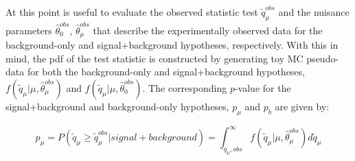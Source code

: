 At this point is useful to evaluate the observed statistic test $\tilde{q}_{\mu}^{obs}$ and the nuisance parameters $\hat{\theta}_0^{obs}$, $\hat{\theta}_{\mu}^{obs}$ that describe  the  experimentally observed data for the background-only and signal+background hypotheses, respectively.
With this in mind, the pdf of the test statistic is constructed by generating toy MC pseudo-data for both the background-only and signal+background hypotheses, 
$f(\tilde{q}_{\mu}| \mu, \hat{\theta}_{\mu}^{obs}  )$ and $f(\tilde{q}_{\mu}| \mu, \hat{\theta}_{0}^{obs}  )$. The corresponding $p$-value for the
signal+background and background-only hypotheses, $p_{\mu}$ and $p_b$ are given by:


\begin{equation}
  p_{\mu}= P( \tilde{q}_{\mu} \geq \tilde{q}_{\mu}^{obs} | signal+background)=  \int_{ q_{\mu},obs }^{\infty } f(\tilde{q}_{\mu}| \mu, \hat{\theta}_{\mu}^{obs}   ) d \tilde{q}_{\mu}   \end{equation}


